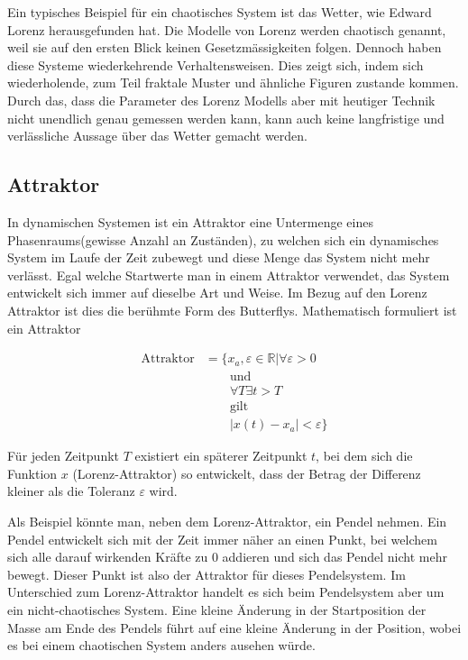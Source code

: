 Ein typisches Beispiel für ein chaotisches System ist das Wetter, wie Edward Lorenz herausgefunden hat. Die Modelle von Lorenz werden chaotisch genannt, weil sie auf den ersten Blick keinen Gesetzmässigkeiten folgen. Dennoch haben diese Systeme wiederkehrende Verhaltensweisen. Dies zeigt sich, indem sich wiederholende, zum Teil fraktale Muster und ähnliche Figuren zustande kommen. Durch das, dass die Parameter des Lorenz Modells aber mit heutiger Technik nicht unendlich genau gemessen werden kann, kann auch keine langfristige und verlässliche Aussage über das Wetter gemacht werden. 

\subsection{Attraktor}
In dynamischen Systemen ist ein Attraktor eine Untermenge eines Phasenraums(gewisse Anzahl an Zuständen), zu welchen sich ein dynamisches System im Laufe der Zeit zubewegt und diese Menge das System nicht mehr verlässt. \cite{wikiattraktor}
 Egal welche Startwerte man in einem Attraktor verwendet, das System entwickelt sich immer auf dieselbe Art und Weise. Im Bezug auf den Lorenz Attraktor ist dies die berühmte Form des Butterflys. Mathematisch formuliert ist ein Attraktor 


\begin{align}
\label{Attraktor} \text{Attraktor} &= \{ x_a,\varepsilon \in \mathbb{R}| \forall \varepsilon > 0 \nonumber\\
&\qquad {} \text{und} \nonumber\\
&\qquad {}  \forall T \exists t > T  \nonumber\\
&\qquad {}\text{gilt} \nonumber\\
&\qquad {} | x(t) - x_a | < \varepsilon \} 
\end{align}

Für jeden Zeitpunkt $T$ existiert ein späterer Zeitpunkt $t$, bei dem sich die Funktion $x$ (Lorenz-Attraktor) so entwickelt, dass der Betrag der Differenz kleiner als die Toleranz $\varepsilon$ wird. 

Als Beispiel könnte man, neben dem Lorenz-Attraktor, ein Pendel nehmen. Ein Pendel entwickelt sich mit der Zeit immer näher an einen Punkt, bei welchem sich alle darauf wirkenden Kräfte zu 0 addieren und sich das Pendel nicht mehr bewegt. Dieser Punkt ist also der Attraktor für dieses Pendelsystem. Im Unterschied zum Lorenz-Attraktor handelt es sich beim Pendelsystem aber um ein nicht-chaotisches System. Eine kleine Änderung in der Startposition der Masse am Ende des Pendels führt auf eine kleine Änderung in der Position, wobei es bei einem chaotischen System anders ausehen würde. 


